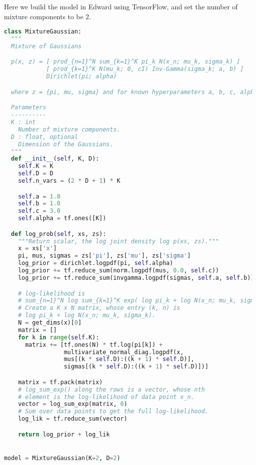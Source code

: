 Here we build the model in Edward using TensorFlow, and set the number
of mixture components to be 2.
\begin{lstlisting}[language=Python]
class MixtureGaussian:
  """
  Mixture of Gaussians

  p(x, z) = [ prod_{n=1}^N sum_{k=1}^K pi_k N(x_n; mu_k, sigma_k) ]
            [ prod_{k=1}^K N(mu_k; 0, cI) Inv-Gamma(sigma_k; a, b) ]
            Dirichlet(pi; alpha)

  where z = {pi, mu, sigma} and for known hyperparameters a, b, c, alpha.

  Parameters
  ----------
  K : int
    Number of mixture components.
  D : float, optional
    Dimension of the Gaussians.
  """
  def __init__(self, K, D):
    self.K = K
    self.D = D
    self.n_vars = (2 * D + 1) * K

    self.a = 1.0
    self.b = 1.0
    self.c = 3.0
    self.alpha = tf.ones([K])

  def log_prob(self, xs, zs):
    """Return scalar, the log joint density log p(xs, zs)."""
    x = xs['x']
    pi, mus, sigmas = zs['pi'], zs['mu'], zs['sigma']
    log_prior = dirichlet.logpdf(pi, self.alpha)
    log_prior += tf.reduce_sum(norm.logpdf(mus, 0.0, self.c))
    log_prior += tf.reduce_sum(invgamma.logpdf(sigmas, self.a, self.b))

    # log-likelihood is
    # sum_{n=1}^N log sum_{k=1}^K exp( log pi_k + log N(x_n; mu_k, sigma_k) )
    # Create a K x N matrix, whose entry (k, n) is
    # log pi_k + log N(x_n; mu_k, sigma_k).
    N = get_dims(x)[0]
    matrix = []
    for k in range(self.K):
      matrix += [tf.ones(N) * tf.log(pi[k]) +
                 multivariate_normal_diag.logpdf(x,
                 mus[(k * self.D):((k + 1) * self.D)],
                 sigmas[(k * self.D):((k + 1) * self.D)])]

    matrix = tf.pack(matrix)
    # log_sum_exp() along the rows is a vector, whose nth
    # element is the log-likelihood of data point x_n.
    vector = log_sum_exp(matrix, 0)
    # Sum over data points to get the full log-likelihood.
    log_lik = tf.reduce_sum(vector)

    return log_prior + log_lik


model = MixtureGaussian(K=2, D=2)
\end{lstlisting}


